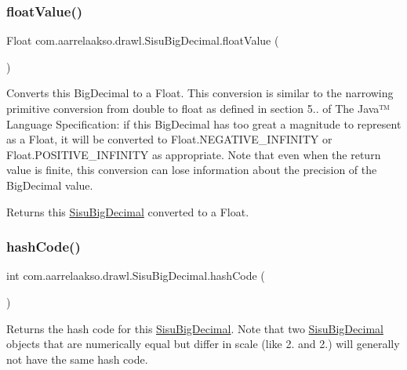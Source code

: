 \subsubsection{\texorpdfstring{float\+Value()}{floatValue()}}
{\footnotesize\ttfamily Float com.\+aarrelaakso.\+drawl.\+Sisu\+Big\+Decimal.\+float\+Value (\begin{DoxyParamCaption}{ }\end{DoxyParamCaption})\hspace{0.3cm}{\ttfamily [protected]}}

Converts this Big\+Decimal to a Float. This conversion is similar to the narrowing primitive conversion from double to float as defined in section 5.. of The Java™ Language Specification\+: if this Big\+Decimal has too great a magnitude to represent as a Float, it will be converted to Float.\+N\+E\+G\+A\+T\+I\+V\+E\+\_\+\+I\+N\+F\+I\+N\+I\+TY or Float.\+P\+O\+S\+I\+T\+I\+V\+E\+\_\+\+I\+N\+F\+I\+N\+I\+TY as appropriate. Note that even when the return value is finite, this conversion can lose information about the precision of the Big\+Decimal value.

\begin{DoxyReturn}{Returns}
this \hyperlink{classcom_1_1aarrelaakso_1_1drawl_1_1_sisu_big_decimal}{Sisu\+Big\+Decimal} converted to a Float. 
\end{DoxyReturn}
\mbox{\label{classcom_1_1aarrelaakso_1_1drawl_1_1_sisu_big_decimal_a34555e12897a07cb48ac84a5b95f320a}} 
\subsubsection{\texorpdfstring{hash\+Code()}{hashCode()}}
{\footnotesize\ttfamily int com.\+aarrelaakso.\+drawl.\+Sisu\+Big\+Decimal.\+hash\+Code (\begin{DoxyParamCaption}{ }\end{DoxyParamCaption})}

Returns the hash code for this \hyperlink{classcom_1_1aarrelaakso_1_1drawl_1_1_sisu_big_decimal}{Sisu\+Big\+Decimal}. Note that two \hyperlink{classcom_1_1aarrelaakso_1_1drawl_1_1_sisu_big_decimal}{Sisu\+Big\+Decimal} objects that are numerically equal but differ in scale (like 2. and 2.) will generally not have the same hash code.

